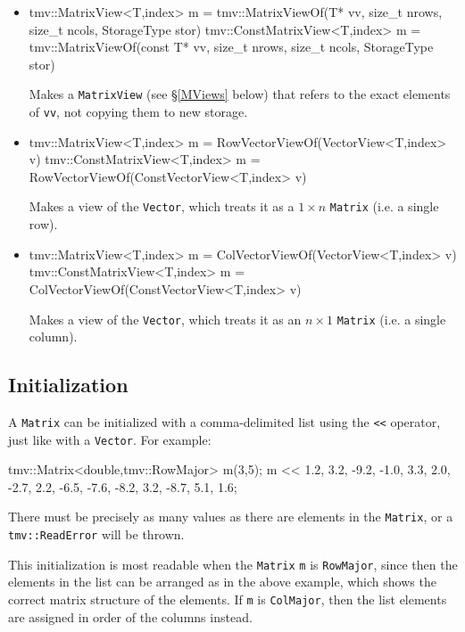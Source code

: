 \documentclass[twoside,letterpaper,11pt]{article}
\renewcommand{\tt}[1]{{\lstinline {#1}}}
\begin{document}
\begin{itemize}
\item
\begin{tmvcode}
tmv::MatrixView<T,index> m = 
      tmv::MatrixViewOf(T* vv, size_t nrows, size_t ncols, 
      StorageType stor)
tmv::ConstMatrixView<T,index> m = 
      tmv::MatrixViewOf(const T* vv,  size_t nrows, size_t ncols, 
      StorageType stor)
\end{tmvcode}
Makes a \tt{MatrixView} (see \S\ref{MViews} below) that refers to the exact
elements of \tt{vv}, not copying them to new storage.

\item
\begin{tmvcode}
tmv::MatrixView<T,index> m = 
      RowVectorViewOf(VectorView<T,index> v)
tmv::ConstMatrixView<T,index> m = 
      RowVectorViewOf(ConstVectorView<T,index> v)
\end{tmvcode}
Makes a view of the \tt{Vector}, which treats it as a $1\times n$ \tt{Matrix}
(i.e. a single row).  

\item
\begin{tmvcode}
tmv::MatrixView<T,index> m = 
      ColVectorViewOf(VectorView<T,index> v)
tmv::ConstMatrixView<T,index> m = 
      ColVectorViewOf(ConstVectorView<T,index> v)
\end{tmvcode}
Makes a view of the \tt{Vector}, which treats it as an $n \times 1$ \tt{Matrix}
(i.e. a single column).  

\end{itemize}

\subsection{Initialization}

A \tt{Matrix} can be initialized with a comma-delimited list using
the \tt{<<} operator, just like with a \tt{Vector}.  For example:
\begin{tmvcode}
tmv::Matrix<double,tmv::RowMajor> m(3,5);
m << 1.2,  3.2, -9.2, -1.0,  3.3, 
     2.0, -2.7,  2.2, -6.5, -7.6, 
    -8.2,  3.2, -8.7,  5.1,  1.6;
\end{tmvcode}
There must be precisely as many values as there are elements in the \tt{Matrix},
or a \tt{tmv::ReadError} will be thrown.

This initialization is most readable when the \tt{Matrix} \tt{m} is \tt{RowMajor}, since then the 
elements in the list can be arranged as in the above example, which shows the
correct matrix structure of the elements.  If \tt{m} is \tt{ColMajor}, then the
list elements are assigned in order of the columns instead.
\end{document}
